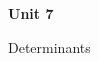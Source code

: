 \documentclass[12pt]{article}
\begin{document}
{\LARGE\bfseries Unit 7\par}
\vspace{3pt}
{\large Determinants\par}

\end{document}
